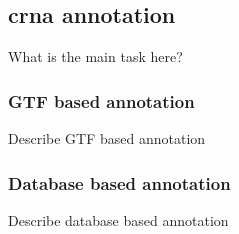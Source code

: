 \subsection{\gls{crna} annotation}
What is the main task here?

\subsubsection{GTF based annotation}
Describe GTF based annotation

\subsubsection{Database based annotation} Describe database based annotation